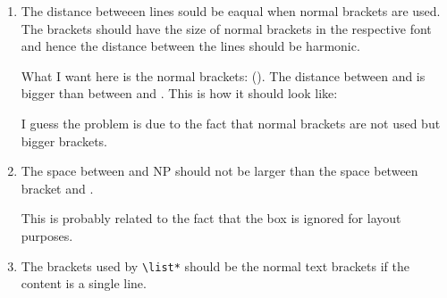 \documentclass[output=book
		,modfonts
		,nonflat
	        ,collection
	        ,collectionchapter
	        ,collectiontoclongg
 	        ,biblatex  
                ,babelshorthands
                ,newtxmath
                ,colorlinks, citecolor=brown 
                ,draftmode
		  ]{langscibook}
\begin{document}
\begin{enumerate}
\item 
The distance betweeen lines sould be eaqual when normal brackets are used. The brackets should have
the size of normal brackets in the respective font and hence the distance between the lines should
be harmonic.

\ea
{}
\z

What I want here is the normal brackets: (). The distance between \phon and \synsem is bigger than
between \synsem and \dtrs. This is how it should look like:

\ea
{}
\z
I guess the problem is due to the fact that normal brackets are not used but bigger brackets.


\item The space between  and NP should not be larger than the space between bracket and .

\ea
{}
\z

This is probably related to the fact that the box is ignored for layout purposes.

\item The brackets used by \verb+\list*+ should be the normal text brackets if the content is a single
  line.

\ea
{}
\z

\end{enumerate}
\end{document}
